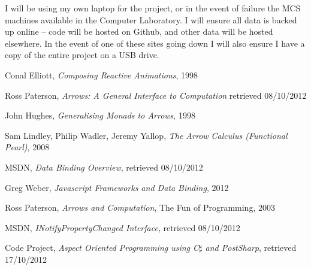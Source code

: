 \documentclass[12pt,a4]{article}
\begin{document}
	I will be using my own laptop for the project, or in the event of failure the MCS machines available in the Computer Laboratory. I will ensure all data is backed up online -- code will be hosted on Github, and other data will be hosted elsewhere. In the event of one of these sites going down I will also ensure I have a copy of the entire project on a USB drive.

\clearpage

\begin{thebibliography}{9}

	Conal Elliott,
	\emph{Composing Reactive Animations},
	1998
	
	Ross Paterson,
	\emph{Arrows: A General Interface to Computation}
	retrieved 08/10/2012
	
	John Hughes,
	\emph{Generalising Monads to Arrows},
	1998
	
	Sam Lindley, Philip Wadler, Jeremy Yallop,
	\emph{The Arrow Calculus (Functional Pearl)},
	2008
	
	MSDN,
	\emph{Data Binding Overview},
	retrieved 08/10/2012
	
	Greg Weber,
	\emph{Javascript Frameworks and Data Binding},
	2012
	
	Ross Paterson,
	\emph{Arrows and Computation},
	The Fun of Programming,
	2003
	
	MSDN,
	\emph{INotifyPropertyChanged Interface},
	retrieved 08/10/2012
	
	Code Project,
	\emph{Aspect Oriented Programming using C$\sharp$ and PostSharp},
	retrieved 17/10/2012

\end{thebibliography}
\end{document}
